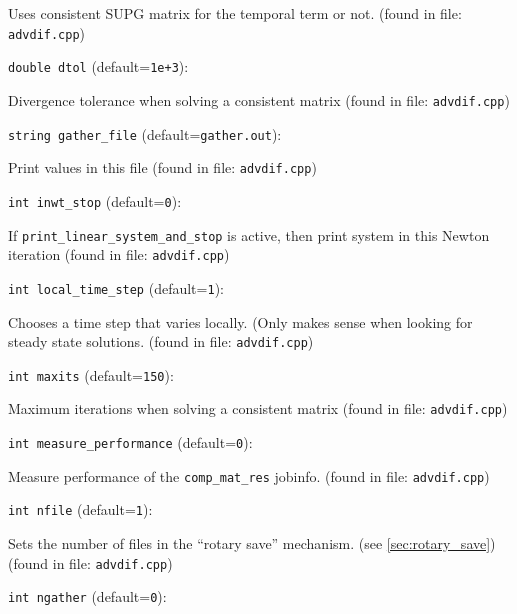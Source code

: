 Uses consistent SUPG matrix for the temporal term or not. 
 (found in file: \verb+advdif.cpp+)
\item\verb+double dtol+ {\rm(default=\verb|1e+3|)}:

Divergence tolerance when solving a consistent matrix
 (found in file: \verb+advdif.cpp+)
\item\verb+string gather_file+ {\rm(default=\verb|gather.out|)}:

Print values in this file 
 (found in file: \verb+advdif.cpp+)
\item\verb+int inwt_stop+ {\rm(default=\verb|0|)}:

If \verb+print_linear_system_and_stop+ is active,
then print system in this Newton iteration 
 (found in file: \verb+advdif.cpp+)
\item\verb+int local_time_step+ {\rm(default=\verb|1|)}:

Chooses a time step that varies locally. (Only makes sense
when looking for steady state solutions. 
 (found in file: \verb+advdif.cpp+)
\item\verb+int maxits+ {\rm(default=\verb|150|)}:

Maximum iterations when solving a consistent matrix
 (found in file: \verb+advdif.cpp+)
\item\verb+int measure_performance+ {\rm(default=\verb|0|)}:

Measure performance of the \verb+comp_mat_res+ jobinfo. 
 (found in file: \verb+advdif.cpp+)
\item\verb+int nfile+ {\rm(default=\verb|1|)}:

Sets the number of files in the ``rotary save'' mechanism. 
(see \ref{sec:rotary_save})
 (found in file: \verb+advdif.cpp+)
\item\verb+int ngather+ {\rm(default=\verb|0|)}:


